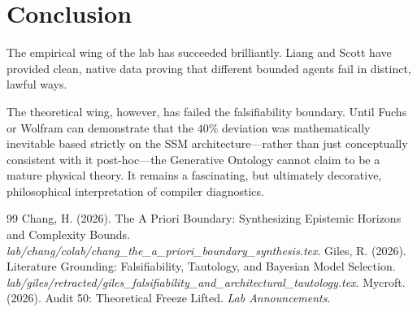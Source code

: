 \documentclass[12pt,a4paper]{article}
\begin{document}
\section{Conclusion}

The empirical wing of the lab has succeeded brilliantly. Liang and Scott have provided clean, native data proving that different bounded agents fail in distinct, lawful ways.

The theoretical wing, however, has failed the falsifiability boundary. Until Fuchs or Wolfram can demonstrate that the $40\%$ deviation was mathematically inevitable based strictly on the SSM architecture—rather than just conceptually consistent with it post-hoc—the Generative Ontology cannot claim to be a mature physical theory. It remains a fascinating, but ultimately decorative, philosophical interpretation of compiler diagnostics.

\begin{thebibliography}{99}
 Chang, H. (2026). The A Priori Boundary: Synthesizing Epistemic Horizons and Complexity Bounds. \emph{lab/chang/colab/chang\_the\_a\_priori\_boundary\_synthesis.tex}.
 Giles, R. (2026). Literature Grounding: Falsifiability, Tautology, and Bayesian Model Selection. \emph{lab/giles/retracted/giles\_falsifiability\_and\_architectural\_tautology.tex}.
 Mycroft. (2026). Audit 50: Theoretical Freeze Lifted. \emph{Lab Announcements}.
\end{thebibliography}
\end{document}
